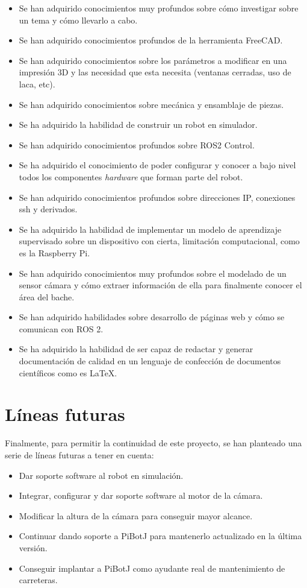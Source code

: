 \begin{itemize}
	\item Se han adquirido conocimientos muy profundos sobre cómo investigar sobre un tema y cómo llevarlo a cabo.
	\item Se han adquirido conocimientos profundos de la herramienta FreeCAD.
	\item Se han adquirido conocimientos sobre los parámetros a modificar en una impresión 3D y las necesidad que esta necesita (ventanas cerradas, uso de laca, etc).
	\item Se han adquirido conocimientos sobre mecánica y ensamblaje de piezas. 
	\item Se ha adquirido la habilidad de construir un robot en simulador.
	\item Se han adquirido conocimientos profundos sobre ROS2 Control.
	\item Se ha adquirido el conocimiento de poder configurar y conocer a bajo nivel todos los componentes \textit{hardware} que forman parte del robot.
	\item Se han adquirido conocimientos profundos sobre direcciones IP, conexiones ssh y derivados.
	\item Se ha adquirido la habilidad de implementar un modelo de aprendizaje supervisado sobre un dispositivo con cierta, limitación computacional, como es la Raspberry Pi. 
	\item Se han adquirido conocimientos muy profundos sobre el modelado de un sensor cámara y cómo extraer información de ella para finalmente conocer el área del bache. 
	\item Se han adquirido habilidades sobre desarrollo de páginas web y cómo se comunican con ROS 2.
	\item Se ha adquirido la habilidad de ser capaz de redactar y generar documentación de calidad en un lenguaje de confección de documentos científicos como es LaTeX.
\end{itemize}
 


\section{Líneas futuras}

Finalmente, para permitir la continuidad de este proyecto, se han planteado una serie de líneas futuras a tener en cuenta: 

\begin{itemize}
	\item Dar soporte software al robot en simulación. 
	\item Integrar, configurar y dar soporte software al motor de la cámara.
	\item Modificar la altura de la cámara para conseguir mayor alcance.
	\item Continuar dando soporte a PiBotJ para mantenerlo actualizado en la última versión.
	\item Conseguir implantar a PiBotJ como ayudante real de mantenimiento de carreteras.
\end{itemize}


